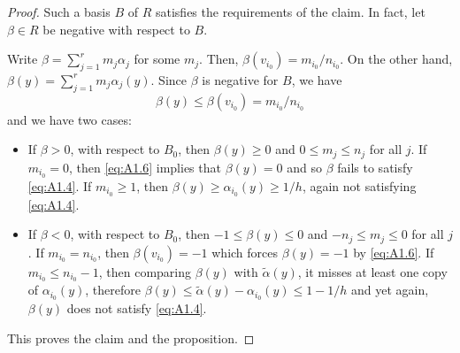 \documentclass[11pt,a4paper]{article}
\theoremstyle{plain}
\theoremstyle{definition}
\begin{document}
\begin{proof}
Such a basis $B$ of $R$ satisfies the requirements of the claim. In fact, let $\beta \in R$ be negative with respect to $B$.

Write $\beta = \sum_{j=1}^r m_j \alpha_j$ for some $m_j$. Then, $\beta(v_{i_0}) = m_{i_0}/n_{i_0}$. On the other hand, $\beta(y) = \sum_{j=1}^r m_j \alpha_j(y)$. Since $\beta$ is negative for $B$, we have
\begin{equation} \label{eq:A1.6}
\beta(y) \leq \beta(v_{i_0}) = m_{i_0}/n_{i_0}
\end{equation}
and we have two cases:
\begin{itemize}
\item If $\beta > 0$, with respect to $B_0$, then $\beta(y) \geq 0$ and $0 \leq m_j \leq n_j$ for all $j$. If $m_{i_0} = 0$, then \eqref{eq:A1.6} implies that $\beta(y) = 0$ and so $\beta$ fails to satisfy \eqref{eq:A1.4}. If $m_{i_0} \geq 1$, then $\beta(y) \geq \alpha_{i_0}(y) \geq 1/h$, again not satisfying \eqref{eq:A1.4}.

\item If $\beta < 0$, with respect to $B_0$, then $-1 \leq \beta(y) \leq 0$ and $-n_j \leq m_j \leq 0$ for all $j$. If $m_{i_0} = n_{i_0}$, then $\beta(v_{i_0}) = -1$ which forces $\beta(y) = -1$ by \eqref{eq:A1.6}. If $m_{i_0} \leq n_{i_0} - 1$, then comparing $\beta(y)$ with $\tilde{\alpha}(y)$, it misses at least one copy of $\alpha_{i_0}(y)$, therefore $\beta(y) \leq \tilde{\alpha}(y) - \alpha_{i_0}(y) \leq 1 - 1/h$ and yet again, $\beta(y)$ does not satisfy \eqref{eq:A1.4}.
\end{itemize}
This proves the claim and the proposition. \qedhere
\end{proof}
\end{document}
